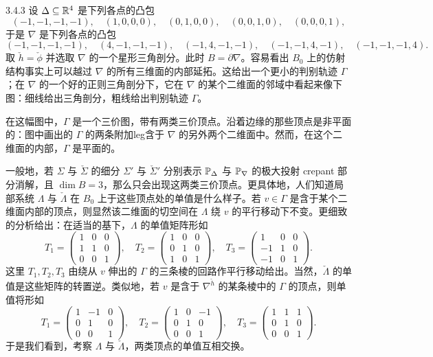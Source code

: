 \begin{example}{3.4.3}
设 $\Delta\subseteq\mathbb{R}^4$ 是下列各点的凸包
\[
(-1,-1,-1,-1),\quad (1,0,0,0),\quad (0,1,0,0),\quad (0,0,1,0),\quad (0,0,0,1),
\]
于是 $\nabla$ 是下列各点的凸包
\[
(-1,-1,-1,-1),\quad (4,-1,-1,-1),\quad (-1,4,-1,-1),\quad (-1,-1,4,-1),\quad (-1,-1,-1,4).
\]
取 $\check h=\check\phi$ 并选取 $\nabla$ 的一个星形三角剖分。此时 $B=\partial\nabla$。容易看出 $B_0$ 上的仿射结构事实上可以越过 $\nabla$ 的所有三维面的内部延拓。这给出一个更小的判别轨迹 $\Gamma$；在 $\nabla$ 的一个好的正则三角剖分下，它在 $\nabla$ 的某个二维面的邻域中看起来像下图：细线给出三角剖分，粗线给出判别轨迹 $\Gamma$。
\end{example}



在这幅图中，$\Gamma$ 是一个三价图，带有两类三价顶点。沿着边缘的那些顶点是非平面的：图中画出的 $\Gamma$ 的两条附加leg含于 $\nabla$ 的另外两个二维面中。然而，在这个二维面的内部，$\Gamma$ 是平面的。

一般地，若 $\Sigma$ 与 $\check\Sigma$ 的细分 $\Sigma'$ 与 $\check\Sigma'$ 分别表示 $\mathbb{P}_\Delta$ 与 $\mathbb{P}_\nabla$ 的极大投射 crepant 部分消解，且 $\dim B=3$，那么只会出现这两类三价顶点。更具体地，人们知道局部系统 $\Lambda$ 与 $\check\Lambda$ 在 $B_0$ 上于这些顶点处的单值是什么样子。若 $v\in\Gamma$ 是含于某个二维面内部的顶点，则显然该二维面的切空间在 $\Lambda$ 绕 $v$ 的平行移动下不变。更细致的分析给出：在适当的基下，$\Lambda$ 的单值矩阵形如
\[
T_1=\begin{pmatrix}1&0&0\\1&1&0\\0&0&1\end{pmatrix},\quad
T_2=\begin{pmatrix}1&0&0\\0&1&0\\1&0&1\end{pmatrix},\quad
T_3=\begin{pmatrix}1&0&0\\-1&1&0\\-1&0&1\end{pmatrix}.
\]
这里 $T_1,T_2,T_3$ 由绕从 $v$ 伸出的 $\Gamma$ 的三条棱的回路作平行移动给出。当然，$\check\Lambda$ 的单值是这些矩阵的转置逆。类似地，若 $v$ 是含于 $\nabla^{\check h}$ 的某条棱中的 $\Gamma$ 的顶点，则单值将形如
\[
T_1=\begin{pmatrix}1&-1&0\\0&1&0\\0&0&1\end{pmatrix},\quad
T_2=\begin{pmatrix}1&0&-1\\0&1&0\\0&0&1\end{pmatrix},\quad
T_3=\begin{pmatrix}1&1&1\\0&1&0\\0&0&1\end{pmatrix}.
\]
于是我们看到，考察 $\Lambda$ 与 $\check\Lambda$，两类顶点的单值互相交换。

